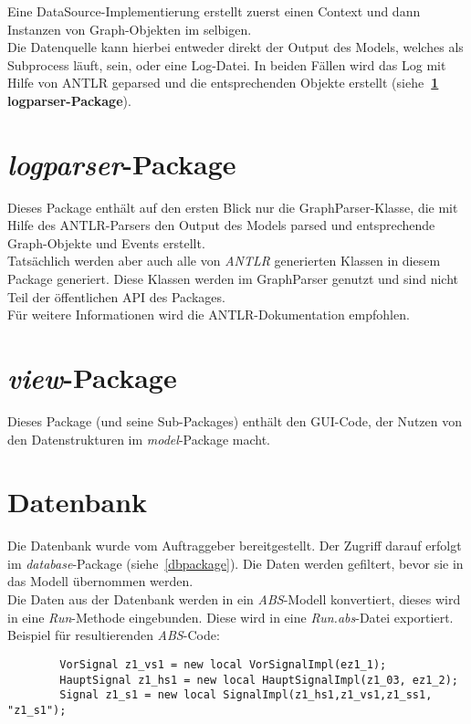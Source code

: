 \documentclass[accentcolor=tud0b,12pt,paper=a4]{tudreport}
\begin{document}
	Eine DataSource-Implementierung erstellt zuerst einen Context und dann Instanzen von Graph-Objekten im selbigen.\\
	Die Datenquelle kann hierbei entweder direkt der Output des Models, welches als Subprocess läuft, sein, oder eine Log-Datei.
	In beiden Fällen wird das Log mit Hilfe von ANTLR geparsed und die entsprechenden Objekte erstellt (siehe\textbf{~\ref{logparser} logparser-Package}).
	
	\chapter{\textit{logparser}-Package}
	\label{logparser}
		Dieses Package enthält auf den ersten Blick nur die GraphParser-Klasse, die mit Hilfe des ANTLR-Parsers den Output des Models parsed und entsprechende Graph-Objekte und Events erstellt.\\
		Tatsächlich werden aber auch alle von \textit{ANTLR} generierten Klassen in diesem Package generiert. Diese Klassen werden im GraphParser genutzt und sind nicht Teil der öffentlichen API des Packages.\\
		
		Für weitere Informationen wird die ANTLR-Dokumentation empfohlen.
		
	\chapter{\textit{view}-Package}
	Dieses Package (und seine Sub-Packages) enthält den GUI-Code, der Nutzen von den Datenstrukturen im \textit{model}-Package macht.
	
	\chapter{Datenbank}
	\label{database}
		Die Datenbank wurde vom Auftraggeber bereitgestellt. Der Zugriff darauf erfolgt im \textit{database}-Package (siehe~\ref{dbpackage}). Die Daten werden gefiltert, bevor sie in das Modell übernommen werden.\\
		Die Daten aus der Datenbank werden in ein \textit{ABS}-Modell konvertiert, dieses wird in eine \textit{Run}-Methode eingebunden. Diese wird in eine \textit{Run.abs}-Datei exportiert.\\
		
		Beispiel für resultierenden \textit{ABS}-Code:\\
		\begin{lstlisting}
		VorSignal z1_vs1 = new local VorSignalImpl(ez1_1);
		HauptSignal z1_hs1 = new local HauptSignalImpl(z1_03, ez1_2);	
		Signal z1_s1 = new local SignalImpl(z1_hs1,z1_vs1,z1_ss1, "z1_s1");
		\end{lstlisting}
\end{document}
